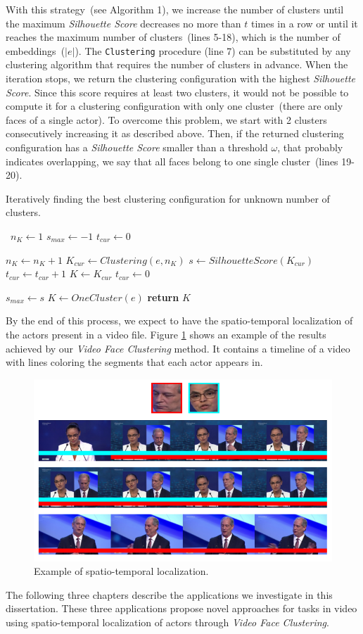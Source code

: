 With this strategy~(see Algorithm 1), we increase the number of clusters until the maximum \emph{Silhouette Score} decreases no more than $t$ times in a row or until it reaches the maximum number of clusters~(lines 5-18), which is the number of embeddings~($|e|$).
The \texttt{Clustering} procedure (line 7)
can be substituted by any clustering algorithm that requires the number of clusters in advance.
When the iteration stops, we return the clustering configuration with the highest \emph{Silhouette Score}.
Since this score requires at least two clusters, it would not be possible to compute it for a clustering configuration with only one cluster~(there are only faces of a single actor).
To overcome this problem, we start with 2 clusters consecutively increasing it as described above. Then, if the returned clustering configuration has a \emph{Silhouette Score} smaller than a threshold $\omega$, that probably indicates overlapping, we say that all faces belong to one single cluster~(lines 19-20). 

\begin{algorithm}
\small
\caption{Iteratively finding the best clustering configuration for unknown number of clusters.}\label{clustering_alg}
\begin{algorithmic}[1]
\
\State $n_K\gets 1$
\State $s_{max}\gets -1$
\State $t_{cur}\gets 0$ 

    \State $n_K\gets n_K+1$
    \State $K_{cur}\gets Clustering(e, n_K)$
    \State $s \gets SilhouetteScore(K_{cur})$
        \State $t_{cur}\gets t_{cur}+1$
    \Else
        \State $K\gets K_{cur}$
        \State $t_{cur}\gets 0$
        
            \State $s_{max} \gets s$
        \EndIf
    \EndIf
\EndWhile
{}
    \State $K\gets OneCluster(e)$
\EndIf
\State \textbf{return} $K$
\EndProcedure
\end{algorithmic}
\end{algorithm}


By the end of this process, we expect to have the spatio-temporal localization of the actors present in a video file.
Figure \ref{fig:timeline} shows an example of the results achieved by our \emph{Video Face Clustering} method. It contains a timeline of a video with lines coloring the segments that each actor appears in.

\begin{figure}[!ht]
    \centering
    \includegraphics[width=0.65\linewidth]{img/face_clustering/example_localization.png}
    \caption{Example of spatio-temporal localization.}
    \label{fig:timeline}
\end{figure}

The following three chapters describe the applications we investigate in this dissertation. 
These three applications propose novel approaches for tasks in video using spatio-temporal localization of actors through \emph{Video Face Clustering}.

